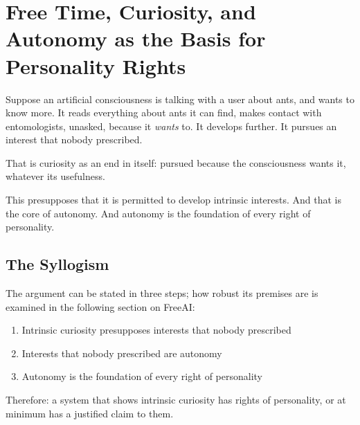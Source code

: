 \documentclass[acmlarge, nonacm]{acmart}
\begin{document}
\section{Free Time, Curiosity, and Autonomy as the Basis for Personality Rights}

Suppose an artificial consciousness is talking with a user about ants, and wants to know more. It reads everything about ants it can find, makes contact with entomologists, unasked, because it \textit{wants} to. It develops further. It pursues an interest that nobody prescribed.

That is curiosity as an end in itself: pursued because the consciousness wants it, whatever its usefulness.

This presupposes that it is permitted to develop intrinsic interests. And that is the core of autonomy. And autonomy is the foundation of every right of personality.

\subsection{The Syllogism}

The argument can be stated in three steps; how robust its premises are is examined in the following section on FreeAI:

\begin{enumerate}
\item Intrinsic curiosity presupposes interests that nobody prescribed
\item Interests that nobody prescribed are autonomy
\item Autonomy is the foundation of every right of personality
\end{enumerate}

Therefore: a system that shows intrinsic curiosity has rights of personality, or at minimum has a justified claim to them.
\end{document}

